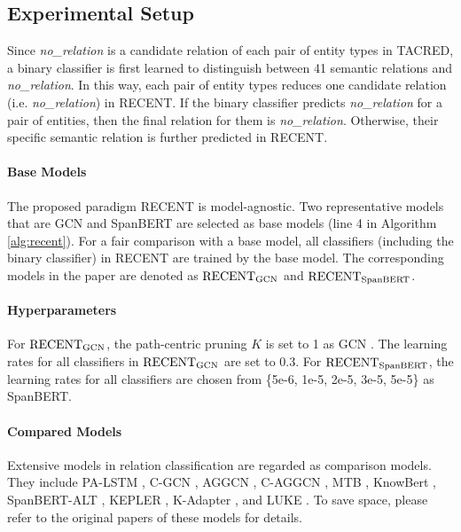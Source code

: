 \documentclass[11pt,a4paper]{article}
\begin{document}
\subsection{Experimental Setup}


Since \textit{no\_relation}  is a candidate relation of  each pair of entity types in TACRED, 
a binary classifier is first learned to distinguish between 41 semantic relations and \textit{no\_relation}.
In this way, each pair of entity types reduces one candidate relation (i.e. \textit{no\_relation}) in RECENT.
If the binary classifier predicts \textit{no\_relation} for a pair of entities, then the final relation for them is \textit{no\_relation}.
Otherwise, their specific semantic relation is further predicted in  RECENT.  


\paragraph{Base Models} The proposed paradigm RECENT is model-agnostic. 
Two representative models 
that are GCN \cite{zhang-etal-2018-graph} and SpanBERT \cite{joshi-etal-2020-spanbert} 
are selected as base models (line 4 in Algorithm \ref{alg:recent}). 
For a fair comparison with a base model, 
all classifiers (including the binary classifier) in RECENT are trained by the base model. 
The corresponding models in the paper are denoted as $\text{RECENT}_{\rm GCN}$ and 	
$\text{RECENT}_{\rm SpanBERT}$.

\paragraph{Hyperparameters}
For $\text{RECENT}_{\rm GCN}$, the path-centric pruning $K$ is set to 1 as GCN \cite{zhang-etal-2018-graph}.
The learning rates for all classifiers in $\text{RECENT}_{\rm GCN}$ are set to 0.3. 
For $\text{RECENT}_{\rm SpanBERT}$, the learning rates for all classifiers are chosen from \{5e-6, 1e-5, 2e-5, 3e-5, 5e-5\} as SpanBERT.

\paragraph{Compared Models} Extensive  models in relation classification are regarded as comparison models. 
They include PA-LSTM \cite{zhang-etal-2017-position}, 
C-GCN  \cite{zhang-etal-2018-graph},
AGGCN  \cite{guo-etal-2019-attention}, 	
C-AGGCN \cite{guo-etal-2019-attention},
MTB  \cite{baldini-soares-etal-2019-matching},
KnowBert   \cite{peters-etal-2019-knowledge}, 
SpanBERT-ALT \cite{lyu-etal-2020-auxiliary},
KEPLER  \cite{wang-etal-2020-kepler}, 
K-Adapter  \cite{wang-etal-2020-k-adapter}, 
and
LUKE  \cite{yamada-etal-2020-luke}. 
To save space, please refer to the original papers of these models for details.
\end{document}
